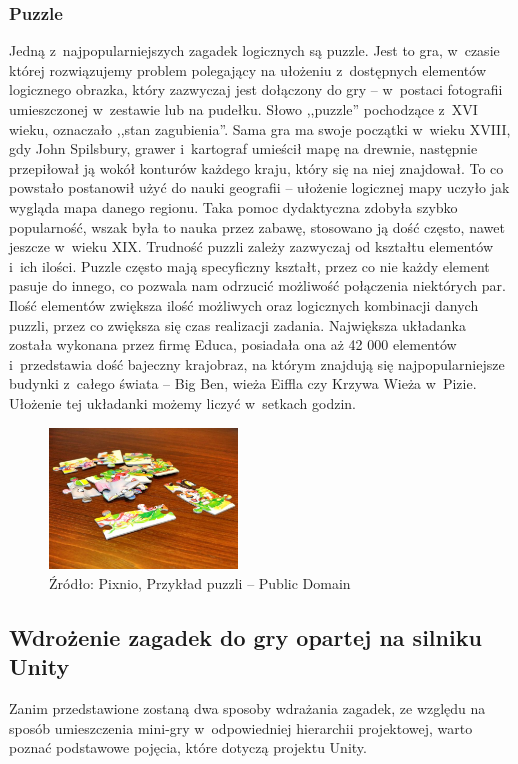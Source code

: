 \documentclass[oneside,polski,logo]{amuthesis}
\begin{document}
\subsubsection{Puzzle}
\par Jedną z~najpopularniejszych zagadek logicznych są puzzle. Jest to gra, w~czasie której rozwiązujemy problem polegający na ułożeniu z~dostępnych elementów logicznego obrazka, który zazwyczaj jest dołączony do gry – w~postaci fotografii umieszczonej w~zestawie lub na pudełku.
Słowo ,,puzzle'' pochodzące z~XVI wieku, oznaczało ,,stan zagubienia''. Sama gra ma swoje początki w~wieku XVIII, gdy John Spilsbury, grawer i~kartograf umieścił mapę na drewnie, następnie przepiłował ją wokół konturów każdego kraju, który się na niej znajdował. To co powstało postanowił użyć do nauki geografii – ułożenie logicznej mapy uczyło jak wygląda mapa danego regionu. Taka pomoc dydaktyczna zdobyła szybko popularność, wszak była to nauka przez zabawę, stosowano ją dość często, nawet jeszcze w~wieku XIX.  
Trudność puzzli zależy zazwyczaj od kształtu elementów i~ich ilości. Puzzle często mają specyficzny kształt, przez co nie każdy element pasuje do innego, co pozwala nam odrzucić możliwość połączenia niektórych par. Ilość elementów zwiększa ilość możliwych oraz logicznych kombinacji danych puzzli, przez co zwiększa się czas realizacji zadania. Największa układanka została wykonana przez firmę Educa, posiadała ona aż 42 000 elementów i~przedstawia dość bajeczny krajobraz, na którym znajdują się najpopularniejsze budynki z~całego świata – Big Ben, wieża Eiffla czy Krzywa Wieża w~Pizie. Ułożenie tej układanki możemy liczyć w~setkach godzin. \cite{puzzle}

\begin{figure}[h]
\centering
\includegraphics[width=5cm]{images/tyrek/puzzle.jpg}
\caption{Źródło: Pixnio, Przykład puzzli – Public Domain}
\end{figure}

\subsection{Wdrożenie zagadek do gry opartej na silniku Unity}
\par Zanim przedstawione zostaną dwa sposoby wdrażania zagadek, ze względu na sposób umieszczenia mini-gry w~odpowiedniej hierarchii projektowej, warto poznać podstawowe pojęcia, które dotyczą projektu Unity.
\end{document}
